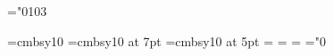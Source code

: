 \newsavebox{\astrutbox}
\sbox{\astrutbox}{\rule[-5pt]{0pt}{20pt}}
\newcommand{\astrut}{\usebox{\astrutbox}}


\ifnfsstwo
  \newcommand{\mitbf}[1] {\hbox{\mathversion{bold}${#1}$}}
  \newcommand{\rmn}[1] {{\mathrm #1}}
  \newcommand{\itl}[1] {{\mathit #1}}
  \newcommand{\bld}[1] {{\mathbf #1}}
\fi
\ifnfssone
  \newmathalphabet{\mathit}
  \newmathalphabet{\mathcal}
  \newcommand{\mitbf}[1] {\hbox{\mathversion{bold}${#1}$}}
  \newcommand{\rmn}[1] {{\mathrm #1}}
  \newcommand{\itl}[1] {{\mathit #1}}
  \newcommand{\bld}[1] {{\mathbf #1}}
\fi
\ifoldfss    
  \newcommand{\mitbf}[1] {\mbox{\boldmath $#1$}}
  \newcommand{\rmn}[1] {{\rm #1}}
  \newcommand{\itl}[1] {{\it #1}}
  \newcommand{\bld}[1] {{\bf #1}}
\fi

\newcommand{\GaPQ}  {G_a(P,Q)}
\newcommand{\Gat}   {\widetilde{G_a}}
\newcommand{\GsPQ}  {G_s(P,Q)}
\newcommand{\kgd}   {k\gamma d}
\newcommand{\ndq}   {\frac{\mbox{$\partial$}}{\mbox{$\partial$} n_q}}
\newcommand{\p}     {\mbox{$\partial$}}
\newcommand{\sh}    {^{\shalf}}
\newcommand{\smh}   {^{-\shalf}}
\newcommand{\sumjm} {\sum_{j=1}^{M}}
\newcommand{\tti}   {\rightarrow\infty}
\newcommand{\ttz}   {\rightarrow 0}
\mathchardef\varLambda="0103


%
\makeatletter
\ifx\CUP@mtlplain@loaded\undefined
  \newcommand{\pvi}{\int_0^{\infty}\mskip -33mu -\quad} %
\else
  \newcommand{\pvi}{\int_0^{\infty}\mskip -30mu -\quad} %
\fi
\makeatother
%


%
\makeatletter
\ifx\CUP@mtlplain@loaded\undefined
  \font\tenbms=cmbsy10
  \font\sevenbms=cmbsy10 at 7pt
  \font\fivebms=cmbsy10 at 5pt
%
  \newfam\bmsfam
  \textfont\bmsfam=\tenbms
  \scriptfont\bmsfam=\sevenbms
  \scriptscriptfont\bmsfam=\fivebms
%
  \def\bms{\fam\bmsfam\tenbms}
  \edef\bsy@{\hexnumber\bmsfam}
  \mathchardef\bnabla="0\bsy@72
\fi
\makeatother
%

\def\eg{{e.g.\ }}
\def\etc{{etc.\ }}
\def\etal{\mbox{\it et al.}}

\newtheorem{lemma}{Lemma}
\newtheorem{corollary}{Corollary}

